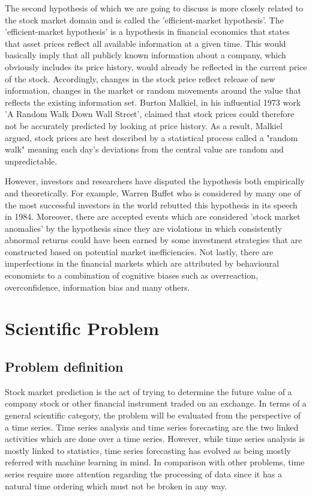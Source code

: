 The second hypothesis of which we are going to discuss is more closely related to the stock market domain and is called the 'efficient-market hypothesis'. The 'efficient-market hypothesis' is a hypothesis in financial economics that states that asset prices reflect all available information at a given time. This would basically imply that all publicly known information about a company, which obviously includes its price history, would already be reflected in the current price of the stock. Accordingly, changes in the stock price reflect release of new information, changes in the market or random movements around the value that reflects the existing information set. Burton Malkiel, in his influential 1973 work 'A Random Walk Down Wall Street', claimed that stock prices could therefore not be accurately predicted by looking at price history. As a result, Malkiel argued, stock prices are best described by a statistical process called a "random walk" meaning each day's deviations from the central value are random and unpredictable.

However, investors and researchers have disputed the hypothesis both empirically and theoretically. For example, Warren Buffet who is considered by many one of the most successful investors in the world rebutted this hypothesis in its speech in 1984.\cite{businessinsiderwarrenbuffet} Moreover, there are accepted events which are considered 'stock market anomalies' by the hypothesis since they are violations in which consistently abnormal returns could have been earned by some investment strategies that are constructed based on potential market inefficiencies. Not lastly, there are imperfections in the financial markets which are attributed by behavioural economists to a combination of cognitive biases such as overreaction, overconfidence, information bias and many others.


\section{Scientific Problem}
\subsection{Problem definition}
Stock market prediction is the act of trying to determine the future value of a company stock or other financial instrument traded on an exchange. In terms of a general scientific category, the problem will be evaluated from the perspective of a time series. Time series analysis and time series forecasting are the two linked activities which are done over a time series. However, while time series analysis is mostly linked to statistics, time series forecasting has evolved as being mostly referred with machine learning in mind. In comparison with other problems, time series require more attention regarding the processing of data since it has a natural time ordering which must not be broken in any way.


